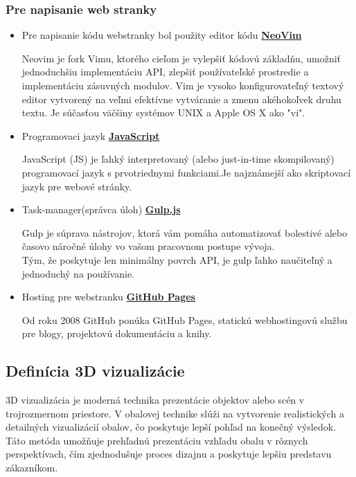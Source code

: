       \subsubsection{Pre napisanie web stranky}
        \begin{itemize}
          \item{
            Pre napisanie kódu webstranky bol použity editor kódu \textbf{\href{https://neovim.io/}{NeoVim}}

            Neovim je fork Vimu, ktorého cieľom je vylepšiť kódovú základňu, umožniť jednoduchšiu implementáciu API, zlepšiť používateľské prostredie a implementáciu zásuvných modulov.
            Vim je vysoko konfigurovateľný textový editor vytvorený na veľmi efektívne vytváranie a zmenu akéhokoľvek druhu textu. Je súčasťou väčšiny systémov UNIX a Apple OS X ako "vi".
          }
          \item{
            Programovaci jazyk \textbf{\href{https://developer.mozilla.org/en-US/docs/Web/JavaScript}{JavaScript}}

            JavaScript (JS) je ľahký interpretovaný (alebo just-in-time skompilovaný) programovací jazyk s prvotriednymi funkciami.Je najznámejší ako skriptovací jazyk pre webové stránky.
          }
          \item{
            Task-manager(správca úloh) \textbf{\href{https://gulpjs.com}{Gulp.js}}

            Gulp je súprava nástrojov, ktorá vám pomáha automatizovať bolestivé alebo časovo náročné úlohy vo vašom pracovnom postupe vývoja. \\
            Tým, že poskytuje len minimálny povrch API, je gulp ľahko naučiteľný a jednoduchý na používanie.
          }
          \item{
            Hosting pre webstranku \textbf{\href{https://pages.github.com/}{GitHub Pages}} 

            Od roku 2008 GitHub ponúka GitHub Pages, statickú webhostingovú službu pre blogy, projektovú dokumentáciu a knihy.
          }
        \end{itemize}

    \subsection{Definícia 3D vizualizácie}
      3D vizualizácia je moderná technika prezentácie objektov alebo scén v trojrozmernom priestore. V obalovej technike slúži na vytvorenie realistických a detailných vizualizácií obalov, čo poskytuje lepší pohľad na konečný výsledok. Táto metóda umožňuje prehľadnú prezentáciu vzhľadu obalu v rôznych perspektívach, čím zjednodušuje proces dizajnu a poskytuje lepšiu predstavu zákazníkom.

